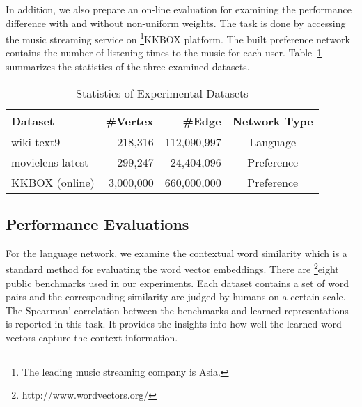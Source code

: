 In addition, we also prepare an on-line evaluation for examining the performance difference with and without non-uniform weights.  The task is done by accessing the music streaming service on \footnote{The leading music streaming company is Asia.}{KKBOX} platform. The built preference network contains the number of listening times to the music for each user. Table~\ref{tb:data} summarizes the statistics of the three examined datasets.


\begin{table}%
\centering
\begin{tabular}{lrrc}
\toprule
Dataset & \#Vertex &  \#Edge & Network Type \\ %
\midrule
wiki-text9		    & 218,316	& 112,090,997	& Language \\
movielens-latest	& 299,247	& 24,404,096	& Preference \\
KKBOX (online)        & 3,000,000	& 660,000,000	& Preference \\
\bottomrule
\end{tabular}
\caption{Statistics of Experimental Datasets}
\label{tb:data}
\end{table}%

\subsection{Performance Evaluations}

For the language network, we examine the contextual word similarity which is a standard method for evaluating the word vector embeddings. There are \footnote{http://www.wordvectors.org/}{eight public benchmarks} used in our experiments.  Each dataset contains a set of word pairs and the corresponding similarity are judged by humans on a certain scale. The Spearman' correlation between the benchmarks and learned representations is reported in this task. It provides the insights into how well the learned word vectors capture the context information.

